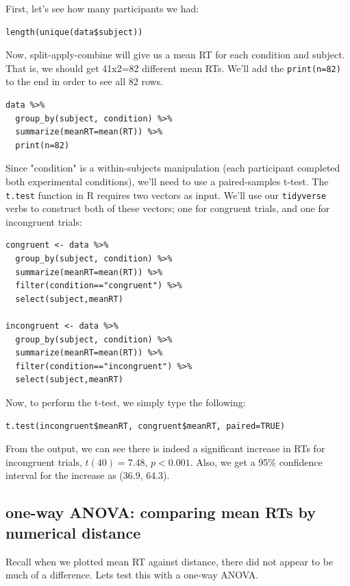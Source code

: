 \documentclass[11pt]{article}
\begin{document}
First, let's see how many participants we had:

\begin{verbatim}
length(unique(data$subject))
\end{verbatim}

Now, split-apply-combine will give us a mean RT for each condition and subject.  That is, we should get 41x2=82 different mean RTs.  We'll add the \texttt{print(n=82)} to the end in order to see all 82 rows.

\begin{verbatim}
data %>%
  group_by(subject, condition) %>%
  summarize(meanRT=mean(RT)) %>%
  print(n=82)
\end{verbatim}

Since "condition" is a within-subjects manipulation (each participant completed both experimental conditions), we'll need to use a paired-samples t-test.  The \texttt{t.test} function in R requires two vectors as input.  We'll use our \texttt{tidyverse} verbs to construct both of these vectors; one for congruent trials, and one for incongruent trials:

\begin{verbatim}
congruent <- data %>%
  group_by(subject, condition) %>%
  summarize(meanRT=mean(RT)) %>%
  filter(condition=="congruent") %>%
  select(subject,meanRT)

incongruent <- data %>%
  group_by(subject, condition) %>%
  summarize(meanRT=mean(RT)) %>%
  filter(condition=="incongruent") %>%
  select(subject,meanRT)
\end{verbatim}

Now, to perform the t-test, we simply type the following:

\begin{verbatim}
t.test(incongruent$meanRT, congruent$meanRT, paired=TRUE)
\end{verbatim}

From the output, we can see there is indeed a significant increase in RTs for incongruent trials, $t(40)=7.48$, $p<0.001$.  Also, we get a 95\% confidence interval for the increase as (36.9, 64.3).

\subsection*{one-way ANOVA: comparing mean RTs by numerical distance}
\label{sec-5-2}

Recall when we plotted mean RT against distance, there did not appear to be much of a difference.  Lets test this with a one-way ANOVA.
\end{document}
